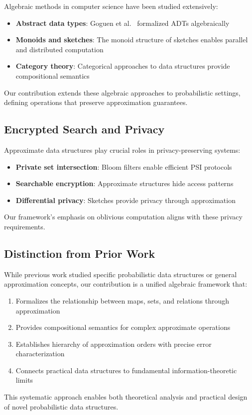 Algebraic methods in computer science have been studied extensively:
\begin{itemize}
    \item \textbf{Abstract data types}: Goguen et al.~\cite{goguen1977} formalized ADTs algebraically
    \item \textbf{Monoids and sketches}: The monoid structure of sketches enables parallel and distributed computation~\cite{boykin2013}
    \item \textbf{Category theory}: Categorical approaches to data structures provide compositional semantics~\cite{bird1997}
\end{itemize}

Our contribution extends these algebraic approaches to probabilistic settings, defining operations that preserve approximation guarantees.

\subsection{Encrypted Search and Privacy}

Approximate data structures play crucial roles in privacy-preserving systems:
\begin{itemize}
    \item \textbf{Private set intersection}: Bloom filters enable efficient PSI protocols~\cite{dong2013}
    \item \textbf{Searchable encryption}: Approximate structures hide access patterns~\cite{cash2014}
    \item \textbf{Differential privacy}: Sketches provide privacy through approximation~\cite{dwork2006}
\end{itemize}

Our framework's emphasis on oblivious computation aligns with these privacy requirements.

\subsection{Distinction from Prior Work}

While previous work studied specific probabilistic data structures or general approximation concepts, our contribution is a unified algebraic framework that:
\begin{enumerate}
    \item Formalizes the relationship between maps, sets, and relations through approximation
    \item Provides compositional semantics for complex approximate operations
    \item Establishes hierarchy of approximation orders with precise error characterization
    \item Connects practical data structures to fundamental information-theoretic limits
\end{enumerate}

This systematic approach enables both theoretical analysis and practical design of novel probabilistic data structures.